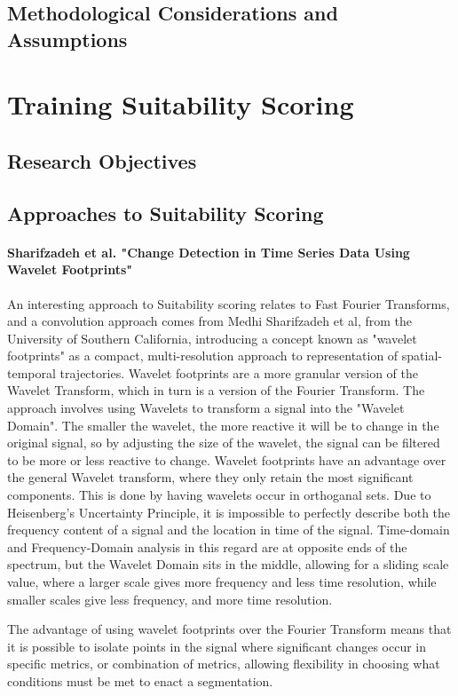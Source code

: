 \documentclass[11pt,a4paper]{report}
\begin{document}
\subsection{Methodological Considerations and Assumptions}

\section{Training Suitability Scoring}

\subsection{Research Objectives}
\subsection{Approaches to Suitability Scoring}
\paragraph{Sharifzadeh et al. "Change Detection in Time Series Data Using Wavelet Footprints"}
An interesting approach to Suitability scoring relates to Fast Fourier Transforms, and a convolution approach comes from Medhi Sharifzadeh et al, from the University of Southern California, introducing a concept known as
"wavelet footprints" as a compact, multi-resolution approach to representation of spatial-temporal trajectories. Wavelet footprints are a  more granular version of the Wavelet Transform, which in turn is a version of the Fourier Transform. The approach involves using Wavelets to transform a signal into the "Wavelet Domain".
The smaller the wavelet, the more reactive it will be to change in the original signal, so by adjusting the size of the wavelet, the signal can be filtered to be more or less reactive to change.
Wavelet footprints have an advantage over the general Wavelet transform, where they only retain the most significant components. This is done by having wavelets occur in orthoganal sets.
Due to Heisenberg's Uncertainty Principle, it is impossible to perfectly describe both the frequency content of a signal and the location in time of the signal. Time-domain and Frequency-Domain analysis in this regard are
at opposite ends of the spectrum, but the Wavelet Domain sits in the middle, allowing for a sliding scale value, where a larger scale gives more frequency and less time resolution, while smaller scales give less frequency, and more time resolution.

The advantage of using wavelet footprints over the Fourier Transform means that it is possible to isolate points in the signal where significant changes occur in specific metrics, or combination of metrics, allowing flexibility in choosing
what conditions must be met to enact a segmentation.
\end{document}
